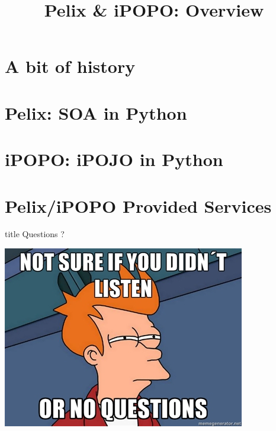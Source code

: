 \documentclass[table]{beamer}
\title[Pelix \& iPOPO]{Pelix \& iPOPO: Overview}
\begin{document}
\frame{\titlepage}

\section{A bit of history}


\section{Pelix: SOA in Python}


\section{iPOPO: iPOJO in Python}


\section{Pelix/iPOPO Provided Services}


\begin{frame}
  \vfill
  \centering
  \begin{beamercolorbox}[sep=8pt,center,shadow=true,rounded=true]{title}
    Questions ?\par%
  \end{beamercolorbox}
  \vspace{3ex}
  \includegraphics[width=.5\textwidth]{../imgs/questions_fry}
  \vfill
\end{frame}
\end{document}
